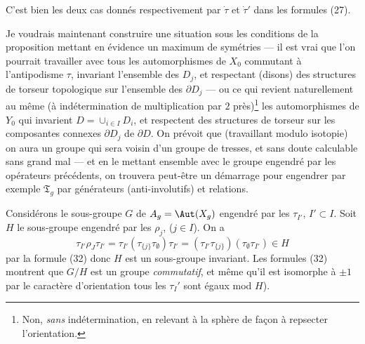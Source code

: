 C'est bien les deux cas donnés respectivement par $\dot\tau$ et $\dot\tau'$ dans les formules (27).

Je voudrais maintenant construire une situation sous les conditions de la proposition mettant en évidence un maximum de symétries --- il est vrai que l'on pourrait travailler avec tous les automorphismes de $X_0$ commutant à l'antipodisme $\tau$, invariant l'ensemble des $D_j$, et respectant (disons) des structures de torseur topologique sur l'ensemble des $\partial D_j$ --- ou ce qui revient naturellement au même (à indétermination de multiplication par $2$ près)\footnote{Non, \emph{sans} indétermination, en relevant à la sphère de fa\c{c}on à repsecter l'orientation.} les automorphismes de $Y_0$ qui invarient $D= \cup_{i\in I} D_i$, et respectent des structures de torseur sur les composantes connexes $\partial D_j$ de $\partial D$. On prévoit que (travaillant modulo isotopie) on aura un groupe qui sera voisin d'un groupe de tresses, et sans doute calculable sans grand mal --- et en le mettant ensemble avec le groupe engendré par les opérateurs précédents, on trouvera peut-être un démarrage pour engendrer par exemple $\mathfrak{T}_g$ par générateurs (anti-involutifs) et relations.

Considérons le sous-groupe $G$ de $A_g={\Aut}(X_g)$ engendré par les $\tau_{I'}$, $I'\subset  I$. Soit ${H}$ le sous-groupe engendré par les $\rho_j$, ($j\in I$). On a
$$
\tau_{I'}\rho_J\tau_{I'}=\tau_{I'}(\tau_{\{j\}}\tau_{\emptyset})
\tau_{I'}=(\tau_{I'}\tau_{\{j\}})(\tau_{\emptyset}\tau_{I'})
\in{H}
$$
par la formule (32) donc ${H}$ est un sous-groupe invariant. Les formules (32) montrent que $G/{H}$ est un groupe \emph{commutatif}, et même qu'il est isomorphe à $\pm 1$ par le caractère d'orientation tous les $\tau_I'$ sont égaux mod ${H}$).

